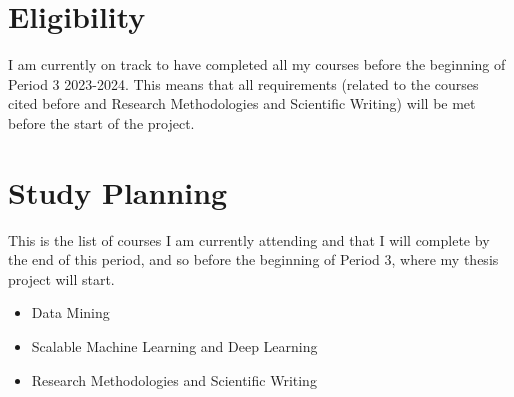 \documentclass[12pt,twoside,english]{article}
\begin{document}
\section{Eligibility}

I am currently on track to have completed all my courses before the beginning of Period 3 2023-2024. This means that all requirements (related to the courses cited before and Research Methodologies and Scientific Writing) will be met before the start of the project.

\section{Study Planning}

This is the list of courses I am currently attending and that I will complete by the end of this period, and so before the beginning of Period 3, where my thesis project will start.
\begin{itemize}
    \item Data Mining
    \item Scalable Machine Learning and Deep Learning 
    \item Research Methodologies and Scientific Writing
\end{itemize}




\appendix



\clearpage
\end{document}
